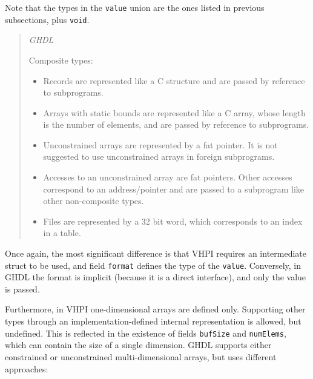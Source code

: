 \documentclass[
]{article}
\providecommand{\tightlist}{%
  \setlength{\itemsep}{0pt}\setlength{\parskip}{0pt}}
\begin{document}
Note that the types in the \texttt{value} union are the ones listed in previous subsections, plus \texttt{void}.

\begin{quote}
\emph{GHDL}

Composite types:

\begin{itemize}
\tightlist
\item
  Records are represented like a C structure and are passed by reference to subprograms.
\item
  Arrays with static bounds are represented like a C array, whose length is the number of elements, and are passed by reference to subprograms.
\item
  Unconstrained arrays are represented by a fat pointer. It is not suggested to use unconstrained arrays in foreign subprograms.
\item
  Accesses to an unconstrained array are fat pointers. Other accesses correspond to an address/pointer and are passed to a subprogram like other non-composite types.
\item
  Files are represented by a 32 bit word, which corresponds to an index in a table.
\end{itemize}
\end{quote}

Once again, the most significant difference is that VHPI requires an intermediate struct to be used, and field \texttt{format} defines the type of the \texttt{value}. Conversely, in GHDL the format is implicit (because it is a direct interface), and only the value is passed.

Furthermore, in VHPI one-dimensional arrays are defined only. Supporting other types through an implementation-defined internal representation is allowed, but undefined. This is reflected in the existence of fields \texttt{bufSize} and \texttt{numElems}, which can contain the size of a single dimension. GHDL supports either constrained or unconstrained multi-dimensional arrays, but uses different approaches:
\end{document}
